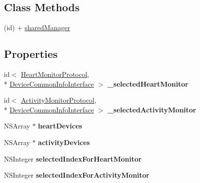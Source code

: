 \subsection*{Class Methods}
\begin{DoxyCompactItemize}
\item 
(id) + \hyperlink{interface_b_t_device_manager_a38ff364ec62dc4ab4aea65f2aebed98c}{shared\-Manager}
\end{DoxyCompactItemize}
\subsection*{Properties}
\begin{DoxyCompactItemize}
\item 
\hypertarget{interface_b_t_device_manager_ab303b2617a6391db56c3b61f217f9b6b}{id$<$ \hyperlink{protocol_heart_monitor_protocol-p}{Heart\-Monitor\-Protocol}, \\*
\hyperlink{protocol_device_common_info_interface-p}{Device\-Common\-Info\-Interface} $>$ {\bfseries \-\_\-selected\-Heart\-Monitor}}\label{interface_b_t_device_manager_ab303b2617a6391db56c3b61f217f9b6b}

\item 
\hypertarget{interface_b_t_device_manager_a53a05cc87797350638a2b82c337eb854}{id$<$ \hyperlink{protocol_activity_monitor_protocol-p}{Activity\-Monitor\-Protocol}, \\*
\hyperlink{protocol_device_common_info_interface-p}{Device\-Common\-Info\-Interface} $>$ {\bfseries \-\_\-selected\-Activity\-Monitor}}\label{interface_b_t_device_manager_a53a05cc87797350638a2b82c337eb854}

\item 
\hypertarget{interface_b_t_device_manager_a76ffd5887aa2d8c8ea20df2384851d41}{N\-S\-Array $\ast$ {\bfseries heart\-Devices}}\label{interface_b_t_device_manager_a76ffd5887aa2d8c8ea20df2384851d41}

\item 
\hypertarget{interface_b_t_device_manager_a8f6f577bb25b7dcd8b3857d6497bff4e}{N\-S\-Array $\ast$ {\bfseries activity\-Devices}}\label{interface_b_t_device_manager_a8f6f577bb25b7dcd8b3857d6497bff4e}

\item 
\hypertarget{interface_b_t_device_manager_a98add70110c91e4266481e312d96afbf}{N\-S\-Integer {\bfseries selected\-Index\-For\-Heart\-Monitor}}\label{interface_b_t_device_manager_a98add70110c91e4266481e312d96afbf}

\item 
\hypertarget{interface_b_t_device_manager_a8e47d59f0a40f8d96f4fea826be853d1}{N\-S\-Integer {\bfseries selected\-Index\-For\-Activity\-Monitor}}\label{interface_b_t_device_manager_a8e47d59f0a40f8d96f4fea826be853d1}


\end{DoxyCompactItemize}
